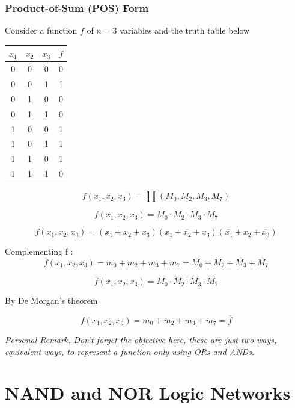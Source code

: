 \documentclass[12pt,openany, tikz,border=10pt]{book}
\begin{document}
\subsubsection{Product-of-Sum (POS) Form}
Consider a function \( f \) of \( n = 3 \) variables and the truth table below
\begin{center}
    \begin{tabular}{ccc|c}
    \( x_1 \) & \( x_2 \) & \( x_3 \) & \( f \) \\
    \hline
    0 & 0 & 0 & 0 \\
    0 & 0 & 1 & 1 \\
    0 & 1 & 0 & 0 \\
    0 & 1 & 1 & 0 \\
    1 & 0 & 0 & 1 \\
    1 & 0 & 1 & 1 \\
    1 & 1 & 0 & 1 \\
    1 & 1 & 1 & 0 \\
    \end{tabular}
    \end{center}
\[
f(x_1, x_2, x_3) = \prod (M_0, M_2, M_3, M_7)
\]

\[
f(x_1, x_2, x_3) = M_0 \cdot M_2 \cdot M_3 \cdot M_7
\]

\[
f(x_1, x_2, x_3) = (x_1 + x_2 + x_3)(x_1 + \overline{x_2} + x_3)(\overline{x_1} + x_2 + \overline{x_3})
\]


Complementing f :
\[
\overline{f}(x_1, x_2, x_3) = m_0 + m_2 + m_3 + m_7 = \overline{M_0} + \overline{M_2} + \overline{M_3} + \overline{M_7}
\]

\[
\overline{f}(x_1, x_2, x_3) = \overline{M_0 \cdot M_2 \cdot M_3 \cdot M_7}
\]

By De Morgan's theorem

\[
f(x_1, x_2, x_3) = m_0 + m_2 + m_3 + m_7 = \overline{f}
\]

\textit{Personal Remark. Don't forget the objective here, these are just two ways, equivalent ways, to represent a function only using ORs and ANDs.}

\section{NAND and NOR Logic Networks}
\end{document}

